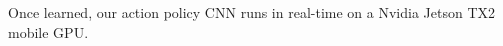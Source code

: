 \documentclass[letterpaper, 10 pt, conference]{ieeeconf}
\begin{document}
Once learned, our action policy CNN runs in real-time on a Nvidia Jetson TX2 mobile GPU. 



\end{document}
